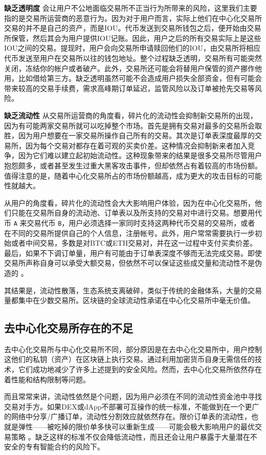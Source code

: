 \documentclass[UTF8]{ctexart}
\begin{document}
\begin{multicols}{2}
\textbf{缺乏透明度} 会让用户不公地面临交易所不正当行为所带来的风险，这里我们主要指的是交易所运营商的恶意行为。因为对于用户而言，实际上他们在中心化交易所交易的并不是自己的资产，而是IOU。代币发送到交易所钱包之后，便开始由交易所保管，然后其会为用户提供IOU记账。因此，用户之后的所有交易实际上是这些IOU之间的交易。提现时，用户会向交易所申请赎回他们的IOU，由交易所将相应代币发送至用户在交易所以往的钱包地址。整个过程缺乏透明，交易所有可能突然关闭，冻结你的帐户或者破产。此外，交易所还可能会将替用户保管的资产挪作他用，比如借给第三方。缺乏透明虽然可能不会造成用户损失全部资金，但有可能会带来较高的交易手续费，需求高峰期订单延迟，监管风险以及订单被抢先交易等风险。

\textbf{缺乏流动性} 从交易所运营商的角度看，碎片化的流动性会抑制新交易所的出现，因为有可能两家交易所就可以吃掉整个市场。首先是拥有交易对最多的交易所会取胜，因为用户想要在一家交易所操作自己所有的交易。其次是订单表深度最厚的交易所，因为每个交易对都存在着可观的买卖价差。这种情况会抑制新来者加入竞争，因为它们难以建立起初始流动性。这种现象带来的结果是很多交易所尽管用户抱怨颇多，或者甚至发生过重大黑客攻击事件，但却依然占有着较高的市场份额。值得注意的是，随着中心化交易所占的市场份额越高，成为更大的攻击目标的可能性就越大。

从用户的角度看，碎片化的流动性会大大影响用户体验，因为在中心化交易所，他们只能在交易所自身的流动池、订单表以及所支持的交易对中进行交易。想要用代币 \verb|A| 来交易代币 \verb|B|，用户必须选择一家同时支持这两种代币交易的交易所，或者在不同的交易所提供自己的个人信息，注册帐号。此外，用户常常需要执行一步初始或者中间交易，多数是对BTC或ETH交易对，并在这一过程中支付买卖价差。最后，如果不下调订单量，用户有可能由于订单表深度不够而无法完成交易。即使交易所声称自身可以承受大额交易，但依然不可以保证这些成交量和流动性不是伪造的 \cite{fakevolume}。

其结果是，流动性散落，生态系统支离破碎，类似于传统的金融体系，大量的交易量都集中在少数交易所。区块链的全球流动性承诺在中心化交易所中毫无价值。

\subsection{去中心化交易所存在的不足}
去中心化交易所与中心化交易所不同，部分原因是在去中心化交易所中，用户控制这他们的私钥（资产）在区块链上执行交易。通过利用加密货币自身无需信任的技术，它们成功地减少了许多上述提到的安全风险。然而，去中心化交易所依然存在着性能和结构限制等问题。

而且常常来讲，流动性依然是个问题，因为用户必须在不同的流动性资金池中寻找交易对手方。如果DEX或dApp不部署可互操作的统一标准，不能做到在一个更广的网络中分享/广播订单，流动性分割效应就依然存在。限价订单表的流动性，也就是弹性——被吃掉的限价单多快可以重新生成——可能会极大影响用户的最优交易策略 \cite{limitorderliquidity}。缺乏这样的标准不仅会降低流动性，而且还会让用户暴露于大量潜在不安全的专有智能合约的风险下。


\end{multicols}
\end{document}
